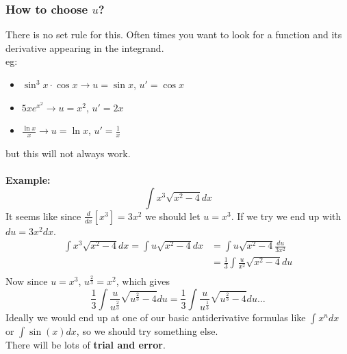 \documentclass[10pt]{article}
\theoremstyle{break}
\begin{document}
\subsubsection{How to choose $u$?}
There is no set rule for this. Often times you want to look for a function and its derivative appearing in the integrand.\\
eg: 
\begin{itemize}
  \item $\sin^3x \cdot \cos x \to u = \sin x$, $u'= \cos x$
  \item $5xe^{x^2} \to u = x^2$, $u'=2x$
  \item $\frac{\ln x}{x} \to u = \ln x$, $u' = \frac{1}{x}$
\end{itemize}
but this will not always work. \\ \vspace{0.5ex} \\
\textbf{Example:} $$\int x^3 \sqrt{x^2 - 4} dx$$
It seems like since $\frac{d}{dx}[x^3] = 3x^2$ we should let $u = x^3$.
If we try we end up with $du = 3x^2 dx$. 
\begin{align*}
  \int x^3 \sqrt{x^2 - 4} dx = \int u \sqrt{x^2 - 4} dx &= \int u \sqrt{x^2 - 4} \frac{du}{3x^2}\\
  &= \frac{1}{3} \int \frac{u}{x^2} \sqrt{x^2 - 4} du\\
\end{align*}
Now since $u = x^3$, $u^{\frac{2}{3}} = x^2$, which gives 
$$\frac{1}{3} \int \frac{u}{u^{\frac{2}{3}}} \sqrt{u^{\frac{2}{3}} - 4}du = 
\frac{1}{3} \int \frac{u}{u^{\frac{1}{3}}} \sqrt{u^{\frac{2}{3}} - 4} du \dots$$
Ideally we would end up at one of our basic antiderivative formulas like $\int x^n dx$ or $\int \sin (x) dx$, so we should
try something else. \\
There will be lots of \textbf{trial and error}.
\end{document}
